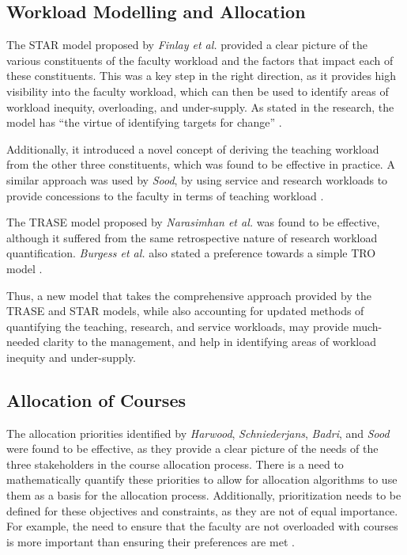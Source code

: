 \subsection{Workload Modelling and Allocation}

The STAR model proposed by \textit{Finlay et al.} provided a clear picture of the various constituents of the faculty workload and the factors that impact each of these constituents. This was a key step in the right direction, as it provides high visibility into the faculty workload, which can then be used to identify areas of workload inequity, overloading, and under-supply. As stated in the research, the model has ``the virtue of identifying targets for change'' \cite{finlay1994management}.

Additionally, it introduced a novel concept of deriving the teaching workload from the other three constituents, which was found to be effective in practice. A similar approach was used by \textit{Sood}, by using service and research workloads to provide concessions to the faculty in terms of teaching workload \cite{rohan2017}.

The TRASE model proposed by \textit{Narasimhan et al.} \cite{narasimhan32trase} was found to be effective, although it suffered from the same retrospective nature of research workload quantification. \textit{Burgess et al.} also stated a preference towards a simple TRO model \cite{burgess2003academic}.

Thus, a new model that takes the comprehensive approach provided by the TRASE and STAR models, while also accounting for updated methods of quantifying the teaching, research, and service workloads, may provide much-needed clarity to the management, and help in identifying areas of workload inequity and under-supply.

\subsection{Allocation of Courses}

The allocation priorities identified by \textit{Harwood}, \textit{Schniederjans}, \textit{Badri}, and \textit{Sood} were found to be effective, as they provide a clear picture of the needs of the three stakeholders in the course allocation process. There is a need to mathematically quantify these priorities to allow for allocation algorithms to use them as a basis for the allocation process. Additionally, prioritization needs to be defined for these objectives and constraints, as they are not of equal importance. For example, the need to ensure that the faculty are not overloaded with courses is more important than ensuring their preferences are met \cite{harwood1975optimizing, schniederjans1987goal, badri1998multi, rohan2017}.

